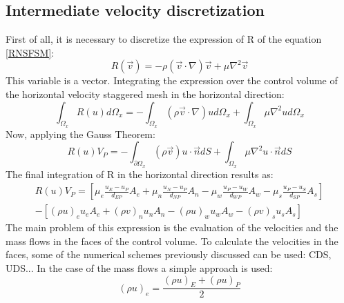 \subsection{Intermediate velocity discretization}
First of all, it is necessary to discretize the expression of R of the equation \ref{RNSFSM}:
\begin{equation}
R\left(\vec{v}\right)=-\rho\left(\vec{v}\cdot\nabla\right)\vec{v}+\mu\nabla^{2}\vec{v}
\end{equation}
This variable is a vector. Integrating the expression over the control volume of the horizontal velocity staggered mesh in the horizontal direction:
\begin{equation}
\int_{\Omega_{x}}R\left(u\right)d\Omega_{x}=-\int_{\Omega_{x}}\left(\rho\vec{v}\cdot\nabla\right)ud\Omega_{x}+\int_{\Omega_{x}}\mu\nabla^{2}ud\Omega_{x}
\end{equation}
Now, applying the Gauss Theorem:
\begin{equation}
R\left(u\right)V_{P}=-\int_{\partial\Omega_{x}}\left(\rho\vec{v}\right)u\cdot\vec{n}dS+\int_{\Omega_{x}}\mu\nabla^{2}u\cdot\vec{n}dS
\end{equation}
The final integration of R in the horizontal direction results as:
\begin{multline}
R\left(u\right)V_{P}=\left[\mu_{e}\frac{u_{E}-u_{P}}{d_{EP}}A_{e}+\mu_{n}\frac{u_{N}-u_{P}}{d_{NP}}A_{n}-\mu_{w}\frac{u_{P}-u_{W}}{d_{WP}}A_{w}-\mu_{s}\frac{u_{P}-u_{S}}{d_{SP}}A_{s}\right] \\
-\left[\left(\rho u\right)_{e}u_{e}A_{e}+\left(\rho v\right)_{n}u_{n}A_{n}-\left(\rho u\right)_{w}u_{w}A_{w}-\left(\rho v\right)_{s}u_{s}A_{s}\right]
\end{multline}
The main problem of this expression is the evaluation of the velocities and the mass flows in the faces of the control volume. To calculate the velocities in the faces, some of the numerical schemes previously discussed can be used: CDS, UDS... In the case of the mass flows a simple approach is used:
\begin{equation}
\left(\rho u\right)_{e}=\frac{\left(\rho u\right)_{E}+\left(\rho u\right)_{P}}{2}
\end{equation}

